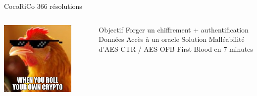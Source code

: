 
\begin{frame}{CocoRiCo \FiveStar \hfill 366 résolutions}
    \begin{columns}[c]
        \begin{center}                  
            \includegraphics[width=0.8\textwidth]{img/meme/cocorico.png}
        \end{center}

           \begin{outline}
               \1 Objectif
                \2 Forger un chiffrement + authentification
               \1 Données
                \2 Accès à un oracle
               \1 Solution
                \2 Malléabilité d'AES-CTR / AES-OFB
               \1 First Blood en 7 minutes \flag{}
           \end{outline}
    \end{columns}
\end{frame}


